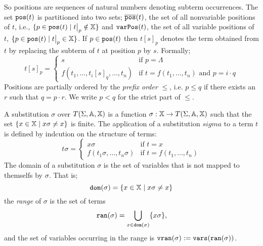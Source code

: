 So positions are sequences of natural numbers denoting subterm occurrences. The set $\mathtt{pos}(t)$ is partitioned into two sets; $\overline{\mathtt{pos}}(t)$, the set of all nonvariable positions of $t$, i.e., $\{p \in \pos{t} \mid \restr{t}{p} \notin \var \}$ and $\mathtt{varPos}(t)$, the set of all variable positions of $t$, $\{p \in \pos{t} \mid \restr{t}{p} \in \var \}$. If $p \in \mathtt{pos}(t)$ then $t[s]_p$ denotes the term obtained from $t$ by replacing the subterm of $t$ at position $p$ by $s$. Formally;
\begin{displaymath}
    t[s]_p =
	\begin{cases}
		s                & \mbox{if } p = \Lambda                               \\
		f(t_1, \dots, t_i[s]_q, \dots, t_n) & \mbox{if } t = f(t_1, \dots, t_n) \mbox{ and } p = i \cdot q
	\end{cases}
\end{displaymath}
Positions are partially ordered by the \textit{prefix order} $\leq$, i.e. $p \leq q$ if there exists an $r$ such that $q = p \cdot r$. We write $p < q$ for the strict part of $\leq$.

A substitution $\sigma$ over $T(\Sigma,\mathbb{A},\mathbb{X})$ is a function $\sigma : \mathbb{X} \to T(\Sigma,\mathbb{A},\mathbb{X})$ such that the set $\{ x \in \mathbb{X} \mid x \sigma \neq x \}$ is finite. The application of a substitution $sigma$ to a term $t$ is defined by indcution on the structure of terms:
\begin{displaymath}
    t\sigma =
	\begin{cases}
		x\sigma                & \mbox{if } t = x                               \\
		f(t_1\sigma, \dots, t_n\sigma) & \mbox{if } t = f(t_1, \dots, t_n)
	\end{cases}
\end{displaymath}
The domain of a substitution $\sigma$ is the set of variables that is not mapped to themselfs by $\sigma$. That is;
$$ \mathtt{dom}(\sigma) = \{x \in \mathbb{X} \mid x \sigma \neq x\}$$
the \textit{range} of $\sigma$ is the set of terms
$$ \mathtt{ran}(\sigma) = \bigcup\limits_{x \in \mathtt{dom}(\sigma)}  \{ x\sigma \},$$
and the set of variables occurring in the range is $\mathtt{v}\mathtt{ran}(\sigma) := \mathtt{vars}(\mathtt{ran}(\sigma))$.

